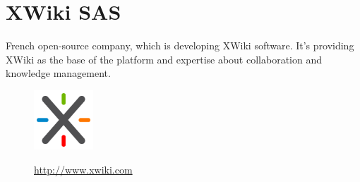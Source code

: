 \documentclass{learnpad}
\begin{document}
\section{XWiki SAS}
French open-source company, which is developing XWiki software.  It's providing
XWiki as the base of the \learnpad platform and expertise about collaboration
and knowledge management.

\begin{figure}[!htp]
	\centering
	\includegraphics[width=6em,keepaspectratio]{figures/xwiki.png}\par
	\url{http://www.xwiki.com}
\end{figure}







% 
% 
\end{document}
